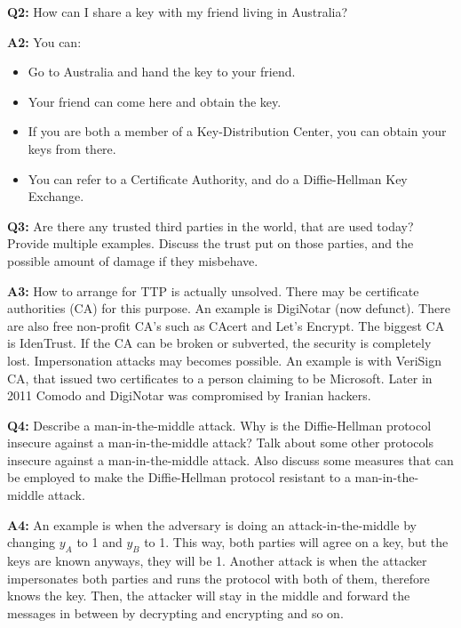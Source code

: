 \documentclass[12pt,reqno]{amsart}
\begin{document}
\vspace{20px}
\textbf{Q2:} How can I share a key with my friend living in Australia?

\textbf{A2:} You can:
\begin{itemize}
	\item Go to Australia and hand the key to your friend.
	\item Your friend can come here and obtain the key.
	\item If you are both a member of a Key-Distribution Center, you can obtain your keys from there.
	\item You can refer to a Certificate Authority, and do a Diffie-Hellman Key Exchange.
\end{itemize}

\vspace{20px}
\textbf{Q3:} Are there any trusted third parties in the world, that are used today? Provide multiple examples. Discuss the trust put on those parties, and the possible amount of damage if they misbehave.

\textbf{A3:} How to arrange for TTP is actually unsolved. There may be certificate authorities (CA) for this purpose. An example is DigiNotar (now defunct). There are also free non-profit CA's such as CAcert and Let's Encrypt. The biggest CA is IdenTrust. If the CA can be broken or subverted, the security is completely lost. Impersonation attacks may becomes possible. An example is with VeriSign CA, that issued two certificates to a person claiming to be Microsoft. Later in 2011 Comodo and DigiNotar was compromised by Iranian hackers.

\vspace{20px}
\textbf{Q4:} Describe a man-in-the-middle attack. Why is the Diffie-Hellman protocol insecure against a man-in-the-middle attack? Talk about some other protocols insecure against a man-in-the-middle attack. Also discuss some measures that can be employed to make the Diffie-Hellman protocol resistant to a man-in-the-middle attack.

\textbf{A4:} An example is when the adversary is doing an attack-in-the-middle by changing $y_A$ to 1 and $y_B$ to 1. This way, both parties will agree on a key, but the keys are known anyways, they will be 1. Another attack is when the attacker impersonates both parties and runs the protocol with both of them, therefore knows the key. Then, the attacker will stay in the middle and forward the messages in between by decrypting and encrypting and so on. 
\end{document}
